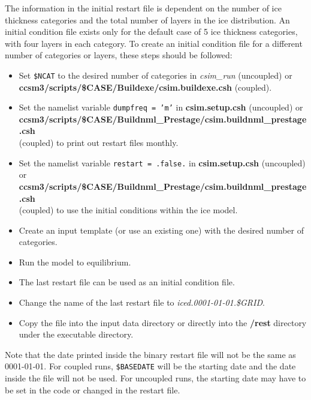 The information in the initial restart file is dependent on the number of
ice thickness categories and the total number of layers in the ice distribution.
An initial condition file exists only for the default case of 5 ice thickness
categories, with four layers in each category. To create an initial condition
file for a different number of categories or layers, these steps should be 
followed:

\begin{itemize}
  \item Set {\tt \$NCAT} to the desired number of categories in {\it csim\_run}
        (uncoupled) or \\
        {\bf ccsm3/scripts/\$CASE/Buildexe/csim.buildexe.csh} (coupled).
  \item Set the namelist variable {\tt dumpfreq = 'm'} in {\bf csim.setup.csh}
        (uncoupled) or \\
        {\bf ccsm3/scripts/\$CASE/Buildnml\_Prestage/csim.buildnml\_prestage.csh} \\
        (coupled) to print out restart files monthly.
  \item Set the namelist variable {\tt restart = .false.} in {\bf csim.setup.csh}
        (uncoupled) or \\
        {\bf ccsm3/scripts/\$CASE/Buildnml\_Prestage/csim.buildnml\_prestage.csh} \\
        (coupled) to use the initial conditions within the ice model.
  \item Create an input template (or use an existing one) with the desired
        number of categories.
  \item Run the model to equilibrium. 
  \item The last restart file can be used as an initial condition file.
  \item Change the name of the last restart file to {\it iced.0001-01-01.\$GRID}.
  \item Copy the file into the input data directory or directly into the {\bf /rest}
        directory under the executable directory.
\end{itemize}

Note that the date printed inside the binary restart file will not be the same as
0001-01-01.  For coupled runs, {\tt \$BASEDATE} will be the starting date and the
date inside the file will not be used.  For uncoupled runs, the starting date may
have to be set in the code or changed in the restart file.

